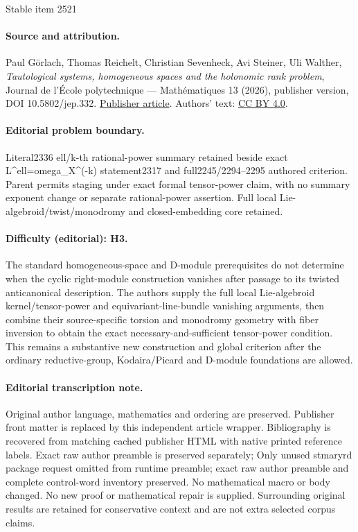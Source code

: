 \documentclass[11pt]{article}
\begin{document}
\begin{center}{\Large Stable item 2521}\end{center}
\paragraph{Source and attribution.}
Paul Görlach, Thomas Reichelt, Christian Sevenheck, Avi Steiner, Uli Walther, \emph{Tautological systems, homogeneous spaces and the holonomic rank problem}, Journal de l’École polytechnique — Mathématiques 13 (2026), publisher version, DOI 10.5802/jep.332. \href{https://jep.centre-mersenne.org/articles/10.5802/jep.332/}{Publisher article}. Authors' text: \href{https://creativecommons.org/licenses/by/4.0/}{CC BY 4.0}.
\paragraph{Editorial problem boundary.}
Literal2336 ell/k-th rational-power summary retained beside exact L\textasciicircum{}ell=omega\_X\textasciicircum{}(-k) statement2317 and full2245/2294–2295 authored criterion. Parent permits staging under exact formal tensor-power claim, with no summary exponent change or separate rational-power assertion. Full local Lie-algebroid/twist/monodromy and closed-embedding core retained.
\paragraph{Difficulty (editorial): H3.}
The standard homogeneous-space and D-module prerequisites do not determine when the cyclic right-module construction vanishes after passage to its twisted anticanonical description. The authors supply the full local Lie-algebroid kernel/tensor-power and equivariant-line-bundle vanishing arguments, then combine their source-specific torsion and monodromy geometry with fiber inversion to obtain the exact necessary-and-sufficient tensor-power condition. This remains a substantive new construction and global criterion after the ordinary reductive-group, Kodaira/Picard and D-module foundations are allowed.
\paragraph{Editorial transcription note.}
Original author language, mathematics and ordering are preserved. Publisher front matter is replaced by this independent article wrapper. Bibliography is recovered from matching cached publisher HTML with native printed reference labels. Exact raw author preamble is preserved separately; Only unused stmaryrd package request omitted from runtime preamble; exact raw author preamble and complete control-word inventory preserved. No mathematical macro or body changed. No new proof or mathematical repair is supplied. Surrounding original results are retained for conservative context and are not extra selected corpus claims.
\clearpage
\end{document}
